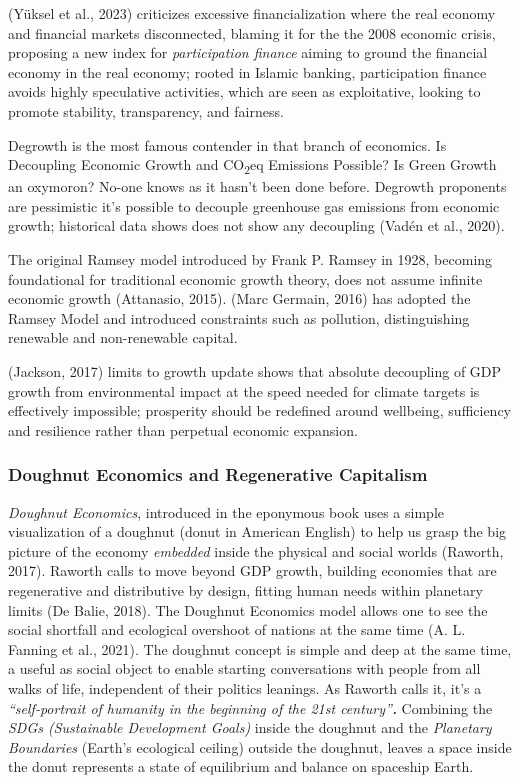 \documentclass[
  12pt,
  letterpaper,
  DIV=11,
  numbers=noendperiod]{scrartcl}
\begin{document}
(Yüksel et al., 2023) criticizes excessive financialization where the
real economy and financial markets disconnected, blaming it for the the
2008 economic crisis, proposing a new index for \emph{participation
finance} aiming to ground the financial economy in the real economy;
rooted in Islamic banking, participation finance avoids highly
speculative activities, which are seen as exploitative, looking to
promote stability, transparency, and fairness.

Degrowth is the most famous contender in that branch of economics. Is
Decoupling Economic Growth and CO\textsubscript{2}eq Emissions Possible?
Is Green Growth an oxymoron? No-one knows as it hasn't been done before.
Degrowth proponents are pessimistic it's possible to decouple greenhouse
gas emissions from economic growth; historical data shows does not show
any decoupling (Vadén et al., 2020).

The original Ramsey model introduced by Frank P. Ramsey in 1928,
becoming foundational for traditional economic growth theory, does not
assume infinite economic growth (Attanasio, 2015). (Marc Germain, 2016)
has adopted the Ramsey Model and introduced constraints such as
pollution, distinguishing renewable and non-renewable capital.

(Jackson, 2017) limits to growth update shows that absolute decoupling
of GDP growth from environmental impact at the speed needed for climate
targets is effectively impossible; prosperity should be redefined around
wellbeing, sufficiency and resilience rather than perpetual economic
expansion.

\subsubsection{Doughnut Economics and Regenerative
Capitalism}\label{doughnut-economics-and-regenerative-capitalism}

\emph{Doughnut Economics}, introduced in the eponymous book uses a
simple visualization of a doughnut (donut in American English) to help
us grasp the big picture of the economy \emph{embedded} inside the
physical and social worlds (Raworth, 2017). Raworth calls to move beyond
GDP growth, building economies that are regenerative and distributive by
design, fitting human needs within planetary limits (De Balie, 2018).
The Doughnut Economics model allows one to see the social shortfall and
ecological overshoot of nations at the same time (A. L. Fanning et al.,
2021). The doughnut concept is simple and deep at the same time, a
useful as social object to enable starting conversations with people
from all walks of life, independent of their politics leanings. As
Raworth calls it, it's a \emph{``self-portrait of humanity in the
beginning of the 21st century''\textbf{.}} Combining the \emph{SDGs
(Sustainable Development Goals)} inside the doughnut and the
\emph{Planetary Boundaries} (Earth's ecological ceiling) outside the
doughnut, leaves a space inside the donut represents a state of
equilibrium and balance on spaceship Earth.
\end{document}
